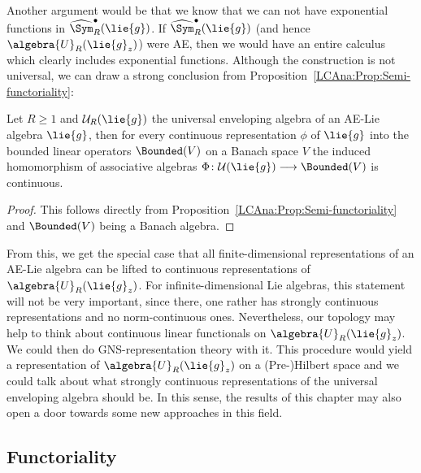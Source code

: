 Another argument would be that we know that we can not have exponential 
functions in $\widehat{\Sym}_R^{\bullet}(\lie{g})$. If 
$\widehat{\Sym}_R^{\bullet}(\lie{g})$ (and hence $\algebra{U}_R(\lie{g}_z)$) 
were AE, then we would have an entire calculus which clearly includes 
exponential functions. Although the construction is not universal, we can draw 
a strong conclusion from Proposition~\ref{LCAna:Prop:Semi-functoriality}:
\begin{corollary}
    \label{LCAna:Coro:ContinuousRepresentations}%
    Let $R \geq 1$ and $\mathcal{U}_R(\lie{g})$ the universal
    enveloping algebra of an AE-Lie algebra $\lie{g}$, then for every
    continuous representation $\phi$ of $\lie{g}$ into the bounded
    linear operators $\Bounded(V)$ on a Banach space $V$ the induced
    homomorphism of associative algebras $\Phi \colon
    \mathcal{U}(\lie{g}) \longrightarrow \Bounded(V)$ is continuous.
\end{corollary}
\begin{proof}
    This follows directly from
    Proposition~\ref{LCAna:Prop:Semi-functoriality} and $\Bounded(V)$
    being a Banach algebra.
\end{proof}
\begin{remark}
	From this, we get the special case that all finite-dimensional 
	representations of an AE-Lie algebra can be lifted to continuous 
	representations of $\algebra{U}_R(\lie{g}_z)$. 
	For infinite-dimensional Lie algebras, this statement will not be very 
	important, since there, one rather has strongly continuous 
	representations and no norm-continuous ones. Nevertheless, our 
	topology may help to think about continuous linear functionals on 
	$\algebra{U}_R(\lie{g}_z)$. We could then do GNS-representation 
	theory with it. This procedure would yield a representation of 
	$\algebra{U}_R(\lie{g}_z)$ on a (Pre-)Hilbert space and we could talk 
	about what strongly continuous representations of the universal 
	enveloping algebra should be. In this sense, the results of this 
	chapter may also open a door towards some new approaches in this field.
\end{remark}



\subsection{Functoriality}

